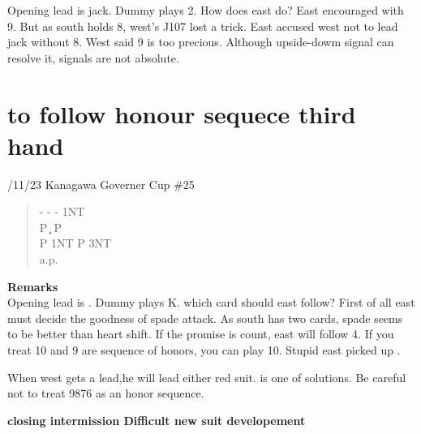 Opening lead is jack. Dummy plays 2. How does east do?
East encouraged with 9. But as south holds 8,
west's J107 lost a trick. East accused west not to
lead jack without 8. West said 9  is too 
precious. Although upside-dowm signal can resolve it,
signals are not absolute. 


\section{to follow honour sequece third hand}

/11/23 Kanagawa Governer Cup \#25
\begin{quote}
%
  {}%
  {}
  {}%
  {}%
\end{quote}
\begin{quote}
\begin{bidding}
-  \> -  \> -  \> 1NT \\
P \c \> P \d \\
P \> 1NT \> P \> 3NT \\
a.p.
\end{bidding}
\end{quote}

{\bf Remarks}\\


Opening lead is . Dummy plays \s K. which
card should east follow?
First of all east must decide the goodness of spade attack.
As south has two cards, spade seems to be better than heart shift.
If the promise is count, east will follow 4.
If you treat 10 and 9 are sequence of honors, you can play 10.
Stupid east picked up .

When west gets a lead,he will lead either red suit.
 is one of solutions. Be careful not to treat
9876 as an honor sequence.




\vspace{0.5cm}
{\bf closing intermission Difficult new suit developement}\\


